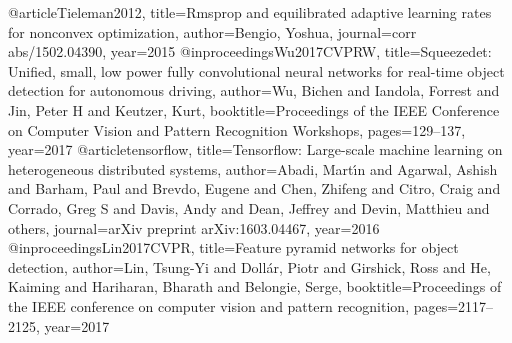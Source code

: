 @article{Tieleman2012,
  title={Rmsprop and equilibrated adaptive learning rates for nonconvex optimization},
  author={Bengio, Yoshua},
  journal={corr abs/1502.04390},
  year={2015}
}
@inproceedings{Wu2017CVPRW,
  title={Squeezedet: Unified, small, low power fully convolutional neural networks for real-time object detection for autonomous driving},
  author={Wu, Bichen and Iandola, Forrest and Jin, Peter H and Keutzer, Kurt},
  booktitle={Proceedings of the IEEE Conference on Computer Vision and Pattern Recognition Workshops},
  pages={129--137},
  year={2017}
}
@article{tensorflow,
  title={Tensorflow: Large-scale machine learning on heterogeneous distributed systems},
  author={Abadi, Mart{\'\i}n and Agarwal, Ashish and Barham, Paul and Brevdo, Eugene and Chen, Zhifeng and Citro, Craig and Corrado, Greg S and Davis, Andy and Dean, Jeffrey and Devin, Matthieu and others},
  journal={arXiv preprint arXiv:1603.04467},
  year={2016}
}
@inproceedings{Lin2017CVPR,
  title={Feature pyramid networks for object detection},
  author={Lin, Tsung-Yi and Doll{\'a}r, Piotr and Girshick, Ross and He, Kaiming and Hariharan, Bharath and Belongie, Serge},
  booktitle={Proceedings of the IEEE conference on computer vision and pattern recognition},
  pages={2117--2125},
  year={2017}
}









